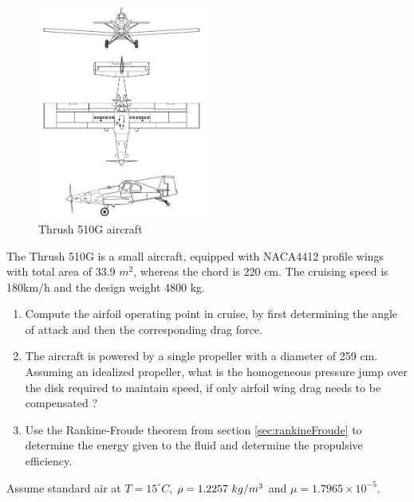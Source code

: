 \begin{figure}[!h]
  \centering
  \includegraphics[width=0.5\textwidth]{thrush.png}
  \caption{Thrush 510G aircraft}
  \label{fig:thrush}
\end{figure}

The Thrush 510G is a small aircraft, equipped with NACA4412 profile
wings with total area of 33.9 $m^2$, whereas the chord is 220 cm. The
cruising speed is 180km/h and the design weight 4800 kg.
\begin{enumerate}
\item Compute the airfoil operating point in cruise, by first
  determining the angle of attack and then the corresponding drag
  force. 
\item The aircraft is powered by a single propeller with a diameter of
  259 cm. Assuming an idealized propeller, what is the homogeneous
  pressure jump over the disk required to maintain speed, if only
  airfoil wing drag needs to be compensated ?
\item Use the Rankine-Froude theorem from section
  \ref{sec:rankineFroude} to determine the energy given to the fluid
  and determine the propulsive efficiency.
\end{enumerate}
Assume standard air at $T=15^\circ C$, \ie $\rho = 1.2257~kg/m^3$ and
$\mu = 1.7965 \times 10^{-5}$.



